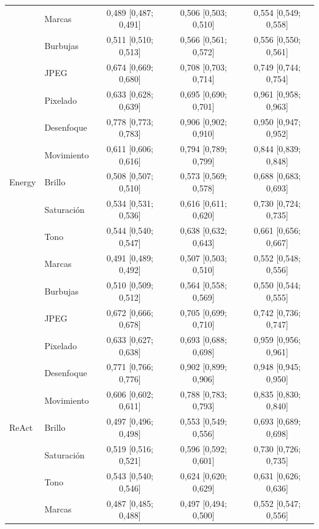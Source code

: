{\begin{longtable}{llccc}
 & Marcas & 0{,}489 [0{,}487; 0{,}491] & 0{,}506 [0{,}503; 0{,}510] & 0{,}554 [0{,}549; 0{,}558] \\
 & Burbujas & 0{,}511 [0{,}510; 0{,}513] & 0{,}566 [0{,}561; 0{,}572] & 0{,}556 [0{,}550; 0{,}561] \\
 & JPEG & 0{,}674 [0{,}669; 0{,}680] & 0{,}708 [0{,}703; 0{,}714] & 0{,}749 [0{,}744; 0{,}754] \\
 & Pixelado & 0{,}633 [0{,}628; 0{,}639] & 0{,}695 [0{,}690; 0{,}701] & 0{,}961 [0{,}958; 0{,}963] \\
 & Desenfoque & 0{,}778 [0{,}773; 0{,}783] & 0{,}906 [0{,}902; 0{,}910] & 0{,}950 [0{,}947; 0{,}952] \\
 & Movimiento & 0{,}611 [0{,}606; 0{,}616] & 0{,}794 [0{,}789; 0{,}799] & 0{,}844 [0{,}839; 0{,}848] \\
\midrule
Energy & Brillo & 0{,}508 [0{,}507; 0{,}510] & 0{,}573 [0{,}569; 0{,}578] & 0{,}688 [0{,}683; 0{,}693] \\
 & Saturación & 0{,}534 [0{,}531; 0{,}536] & 0{,}616 [0{,}611; 0{,}620] & 0{,}730 [0{,}724; 0{,}735] \\
 & Tono & 0{,}544 [0{,}540; 0{,}547] & 0{,}638 [0{,}632; 0{,}643] & 0{,}661 [0{,}656; 0{,}667] \\
 & Marcas & 0{,}491 [0{,}489; 0{,}492] & 0{,}507 [0{,}503; 0{,}510] & 0{,}552 [0{,}548; 0{,}556] \\
 & Burbujas & 0{,}510 [0{,}509; 0{,}512] & 0{,}564 [0{,}558; 0{,}569] & 0{,}550 [0{,}544; 0{,}555] \\
 & JPEG & 0{,}672 [0{,}666; 0{,}678] & 0{,}705 [0{,}699; 0{,}710] & 0{,}742 [0{,}736; 0{,}747] \\
 & Pixelado & 0{,}633 [0{,}627; 0{,}638] & 0{,}693 [0{,}688; 0{,}698] & 0{,}959 [0{,}956; 0{,}961] \\
 & Desenfoque & 0{,}771 [0{,}766; 0{,}776] & 0{,}902 [0{,}899; 0{,}906] & 0{,}948 [0{,}945; 0{,}950] \\
 & Movimiento & 0{,}606 [0{,}602; 0{,}611] & 0{,}788 [0{,}783; 0{,}793] & 0{,}835 [0{,}830; 0{,}840] \\
\midrule
ReAct & Brillo & 0{,}497 [0{,}496; 0{,}498] & 0{,}553 [0{,}549; 0{,}556] & 0{,}693 [0{,}689; 0{,}698] \\
 & Saturación & 0{,}519 [0{,}516; 0{,}521] & 0{,}596 [0{,}592; 0{,}601] & 0{,}730 [0{,}726; 0{,}735] \\
 & Tono & 0{,}543 [0{,}540; 0{,}546] & 0{,}624 [0{,}620; 0{,}629] & 0{,}631 [0{,}626; 0{,}636] \\
 & Marcas & 0{,}487 [0{,}485; 0{,}488] & 0{,}497 [0{,}494; 0{,}500] & 0{,}552 [0{,}547; 0{,}556] \\

\end{longtable}}
